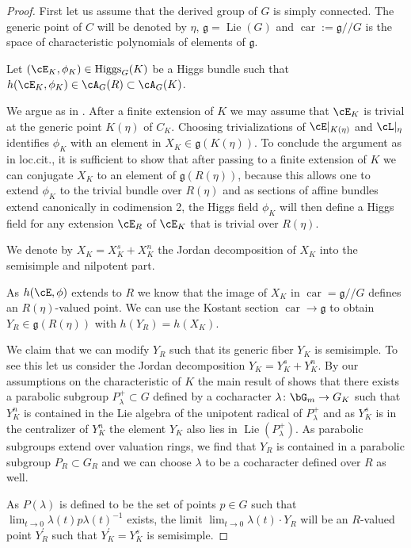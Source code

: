 \documentclass[a4paper]{amsart}
\numberwithin{equation}{section}
\theoremstyle{plain}
\theoremstyle{definition}
\newcommand{\co}{\colon}
\DeclareMathOperator{\Lie}{Lie}
\DeclareMathOperator{\Higgs}{Higgs}
\DeclareMathOperator{\car}{car}
\def\cg{\mathfrak{g}}
\begin{document}
\begin{proof}
	First let us assume that the derived group of $G$ is simply connected. The generic point of $C$ will be denoted by $\eta$, $\cg=\Lie(G)$ and $\car:=\cg/\!/G$ is the space of characteristic polynomials of elements of $\cg$.
	
	Let $(\cE_K,\phi_K)\in \Higgs_G(K)$ be a Higgs bundle such that $h(\cE_K,\phi_K)\in \cA_G(R)\subset \cA_G(K)$. 
	
	We argue as in \cite[\S 8.4]{ChaudouardLaumonLFP1}. After a finite extension of $K$ we may assume that $\cE_K$ is trivial at the generic point $K(\eta)$ of $C_K$. Choosing trivializations of $\cE|_{K(\eta)}$ and $\cL|_\eta$ identifies $\phi_K$ with an element in $X_K\in \cg(K(\eta))$. To conclude the argument as in loc.cit., it is sufficient to show that after passing to a finite extension of $K$ we can conjugate $X_K$ to an element of $\cg(R(\eta))$,  because this allows one to extend $\phi_K$ to the trivial bundle over $R(\eta)$ and as sections of affine bundles extend canonically in codimension 2, the Higgs field $\phi_K$ will then  define a Higgs field for any extension $\cE_R$ of $\cE_K$ that is trivial over $R(\eta)$.
	
	We denote by $X_K=X_K^s + X_K^n$ the Jordan decomposition of $X_K$ into the semisimple and nilpotent part. 
	
	As $h(\cE,\phi)$ extends to $R$ we know that the image of $X_K$ in $\car=\cg/\!/G$ defines an $R(\eta)$-valued point. We can use the Kostant section $\car \to \cg$ to obtain $Y_R\in \cg(R(\eta))$ with $h(Y_R)=h(X_K)$. 
	
	We claim that we can modify $Y_R$ such that its generic fiber $Y_K$ is semisimple. To see this let us consider the Jordan decomposition $Y_K=Y_K^s + Y_K^n$. By our assumptions on the characteristic of $K$ the main result of \cite{McNinchSL2} shows that there exists a parabolic subgroup $P_{\lambda}^+\subset G$ defined by a cocharacter $\lambda \co \bG_m \to G_K$ such that $Y_K^n$ is contained in the Lie algebra of the unipotent radical of $P^+_{\lambda}$ and as $Y_K^s$ is in the centralizer of $Y_K^n$  the element $Y_K$ also lies in $\Lie(P_{\lambda}^+)$. As parabolic subgroups extend over valuation rings, we find that $Y_R$ is contained in a parabolic subgroup $P_R\subset G_R$ and we can choose $\lambda$ to be a cocharacter defined over $R$ as well. 
	
	As $P(\lambda)$ is defined to be the set of points {$p \in G$} such that $\lim_{t \to 0} \lambda(t)p\lambda(t)^{-1}$ exists, the limit $\lim_{t \to 0}\lambda(t) \cdot Y_R$ will be an $R$-valued point $Y^\prime_R$ such that $Y^\prime_K=Y_K^s$ is semisimple.
	

\end{proof}
\end{document}
